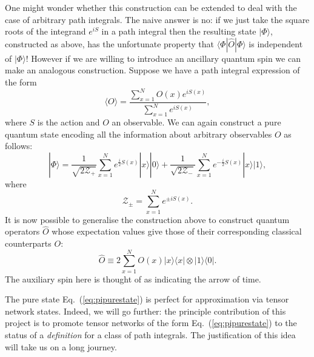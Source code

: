 \documentclass[twocolumn,lengthcheck,superscriptaddress]{revtex4-1}
\theoremstyle{definition}
\theoremstyle{remark}
\begin{document}
One might wonder whether this construction can be extended to deal with the case of arbitrary path integrals. The naive answer is no: if we just take the square roots of the integrand $e^{iS}$ in a path integral then the resulting state $|\Phi\rangle$, constructed as above, has the unfortunate property that $\langle \Phi| \widehat{O}|\Phi\rangle$ is independent of $|\Phi\rangle$! However if we are willing to introduce an ancillary quantum spin we can make an analogous construction. Suppose we have a path integral expression of the form 
\begin{equation}
	\langle O \rangle = \frac{\sum_{x=1}^N O(x) e^{iS(x)}}{\sum_{x=1}^N e^{iS(x)}},
\end{equation}
where $S$ is the action and $O$ an observable. We can again construct a pure quantum state encoding all the information about arbitrary observables $O$ as follows:
\begin{equation}\label{eq:pipurestate}
	|\Phi\rangle = \frac{1}{\sqrt{2\mathcal{Z_+}}}\sum_{x=1}^N e^{\frac{i}{2}S(x)} |x\rangle|0\rangle + \frac{1}{\sqrt{2\mathcal{Z_-}}}\sum_{x=1}^N e^{-\frac{i}{2}S(x)} |x\rangle|1\rangle,
\end{equation}
where
\begin{equation}
	\mathcal{Z_\pm} = \sum_{x=1}^N e^{\pm iS(x)}.
\end{equation}
It is now possible to generalise the construction above to construct quantum operators $\widehat{O}$ whose expectation values give those of their corresponding classical counterparts $O$:
\begin{equation}
	\widehat{O} \equiv 2\sum_{x=1}^N O(x) |x\rangle\langle x|\otimes |1\rangle\langle 0|.
\end{equation}
The auxiliary spin here is thought of as indicating the arrow of time.

The pure state Eq.~(\ref{eq:pipurestate}) is perfect for approximation via tensor network states. Indeed, we will go further: the principle contribution of this project is to promote tensor networks of the form Eq.~(\ref{eq:pipurestate}) to the status of a \emph{definition} for a class of path integrals. The justification of this idea will take us on a long journey.
\end{document}
